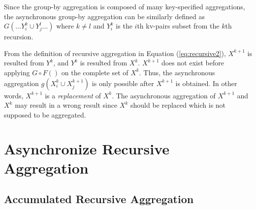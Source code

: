 Since the group-by aggregation is composed of many key-specified aggregations, the asynchronous group-by aggregation can be similarly defined as $G(\ldots Y_{i}^k\cup Y_{j}^{l}\ldots)$ where $k\neq l$ and $Y_i^k$ is the $i$th kv-pairs subset from the $k$th recursion.


From the definition of recursive aggregation in Equation (\ref{eq:recursive2}), $X^{k+1}$ is resulted from $Y^k$, and $Y^k$ is resulted from $X^k$. $X^{k+1}$ does not exist before applying $G\circ F()$ on the complete set of $X^k$. Thus, the asynchronous aggregation $g(X_i^k\cup X_j^{k+1})$ is only possible after $X^{k+1}$ is obtained. In other words, $X^{k+1}$ is a \emph{replacement} of $X^k$. The asynchronous aggregation of $X^{k+1}$ and $X^k$ may result in a wrong result since $X^k$ should be replaced which is not supposed to be aggregated.

\section{Asynchronize Recursive Aggregation}
\subsection{Accumulated Recursive Aggregation}
\label{sec:async:accrec}

